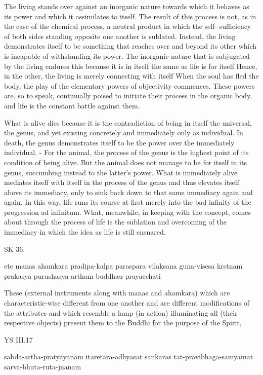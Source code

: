    The living stands over against an inorganic nature towards which it
    behaves as its power and which it assimilates to itself. The result of this process
    is not, as in the case of the chemical process, a neutral product in which the self-
    sufficiency of both sides standing opposite one another is sublated. Instead, the
    living demonstrates itself to be something that reaches over and beyond its other
    which is incapable of withstanding its power. The
    inorganic nature that is subjugated by the living endures this because it is in itself
    the same as life is for itself Hence, in the other, the living is merely connecting
    with itself When the soul has fled the body, the play of the elementary powers
    of objectivity commences. These powers are, so to speak, continually poised to
    initiate their process in the organic body, and life is the constant battle against
    them.

    What is alive dies because it is the contradiction of being in itself
    the universal, the genus, and yet existing concretely and immediately only as
    individual. In death, the genus demonstrates itself to be the power over the
    immediately individual. - For the animal, the process of the genus is the highest
    point of its condition of being alive. But the animal does not manage to be for
    itself in its genus, succumbing instead to the latter's power. What is immediately
    alive mediates itself with itself in the process of the genus and thus elevates itself
    above its immediacy, only to sink back down to that same immediacy again and
    again. In this way, life runs its course at first merely into the bad infinity of the
    progression ad infinitum. What, meanwhile, in keeping with the concept, comes
    about through the process of life is the sublation and overcoming of the immediacy
    in which the idea as life is still ensnared.

SK 36.

ete manas ahamkara pradipa-kalpa paraspara vilaksana
guna-visesa krstnam prakasya purushasya-artham buddhau prayacchati

These (external instruments along with manas and ahamkara)
which are characteristic-wise different from one another
and are different modifications of the attributes
and which resemble a lamp (in action) illuminating all (their respective objects)
present them to the Buddhi for the purpose of the Spirit,

    YS III.17

    sabda-artha-pratyayanam itaretara-adhyasat sankaras tat-pravibhaga-samyamat sarva-bhuta-ruta-jnanam

